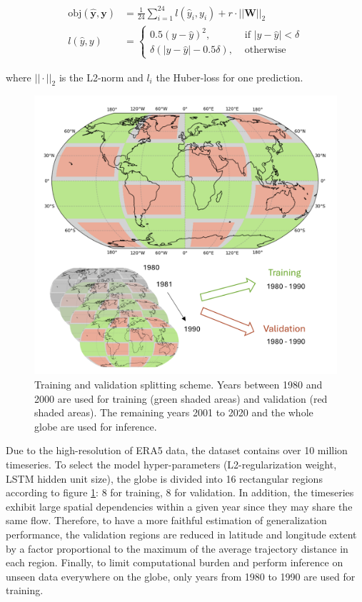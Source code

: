 \documentclass[11pt,a4paper,twoside,openright]{report}
\theoremstyle{definition}
\begin{document}
\begin{equation}
  \begin{aligned}
   \text{obj}(\mathbf{\hat{y}},\mathbf{y}) & = \frac{1}{24}\sum_{i=1}^{24} l(\hat{y}_i,y_i) + r \cdot || \mathbf{W} ||_2 \\
   l(\hat{y},y) & = \begin{cases} 0.5(y - \hat{y})^2, & \text{ if } |y - \hat{y}| < \delta \\
   \delta \left( |y - \hat{y}| -0.5\delta \right), & \text{ otherwise } \end{cases}
   \end{aligned}
\label{eq:obj}
\end{equation}

where \(||\cdot ||_2\) is the L2-norm and \(l_i\) the Huber-loss for one prediction.

\begin{figure}[h]

{\centering \includegraphics[width=0.8\linewidth]{images/test_train_fig} 

}

\caption{Training and validation splitting scheme. Years between 1980 and 2000 are used for training (green shaded areas) and validation (red shaded areas). The remaining years 2001 to 2020 and the whole globe are used for inference.}\label{fig:traintest}
\end{figure}

Due to the high-resolution of ERA5 data, the dataset contains over 10 million timeseries. To select the model hyper-parameters (L2-regularization weight, LSTM hidden unit size), the globe is divided into 16 rectangular regions according to figure \ref{fig:traintest}: 8 for training, 8 for validation. In addition, the timeseries exhibit large spatial dependencies within a given year since they may share the same flow. Therefore, to have a more faithful estimation of generalization performance, the validation regions are reduced in latitude and longitude extent by a factor proportional to the maximum of the average trajectory distance in each region. Finally, to limit computational burden and perform inference on unseen data everywhere on the globe, only years from 1980 to 1990 are used for training.
\end{document}
